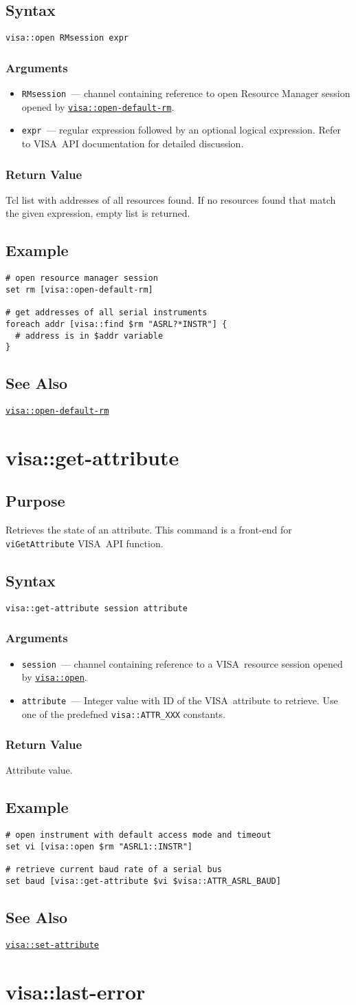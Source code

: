 \documentclass[12pt, a4paper]{report}
\newcommand{\VISA}{\mbox{VISA }}
\newcommand{\COMMANDREF}[1]{{\tt \hyperref[#1]{#1}}}
\newcommand{\VISACOMMANDREF}[1]{{\tt \mbox{#1}}\index{#1}}
\newcommand{\SEEALSO}{\subsection*{See Also}}
\newcommand{\EXAMPLE}{\subsection*{Example}}
\newcommand{\PURPOSE}{\subsection*{Purpose}}
\newcommand{\SYNTAX}[1]{\subsection*{Syntax}{\tt #1}}
\newcommand{\ARGUMENTS}{\subsubsection*{Arguments}}
\newcommand{\RETURN}{\subsubsection*{Return Value}}
\newcommand{\COMMAND}[1]{\section{#1}\label{#1}}
\newcommand{\BEGINARGUMENTS}{\ARGUMENTS\begin{itemize}}
\newcommand{\ENDARGUMENTS}{\end{itemize}}
\newcommand{\ARGUMENT}[1]{\item {\tt \mbox{#1}}~---}
\newcommand{\ARGCHANNEL}{\ARGUMENT{session} channel containing reference to a \VISA resource session opened by \COMMANDREF{visa::open}.}
\newcommand{\ARGRM}{\ARGUMENT{RMsession} channel containing reference to open Resource Manager session opened by \COMMANDREF{visa::open-default-rm}.}
\begin{document}
\SYNTAX{visa::open RMsession expr}

\BEGINARGUMENTS
\ARGRM
\ARGUMENT{expr} regular expression followed by an optional logical expression. Refer to \VISA API documentation for detailed discussion.
\ENDARGUMENTS

\RETURN

Tcl list with addresses of all resources found. If no resources found that match the given expression, empty list is returned.

\EXAMPLE

\begin{verbatim} 
# open resource manager session
set rm [visa::open-default-rm]

# get addresses of all serial instruments
foreach addr [visa::find $rm "ASRL?*INSTR"] {
  # address is in $addr variable
}
\end{verbatim} 

\SEEALSO

\COMMANDREF{visa::open-default-rm}


\COMMAND{visa::get-attribute}

\PURPOSE

Retrieves the state of an attribute. This command is a front-end for \VISACOMMANDREF{viGetAttribute} \VISA API function.

\SYNTAX{visa::get-attribute session attribute}

\BEGINARGUMENTS
\ARGCHANNEL
\ARGUMENT{attribute} Integer value with ID of the \VISA attribute to retrieve. Use one of the predefned {\tt visa::ATTR\_XXX} constants.
\ENDARGUMENTS

\RETURN

Attribute value.

\EXAMPLE

\begin{verbatim} 
# open instrument with default access mode and timeout
set vi [visa::open $rm "ASRL1::INSTR"]

# retrieve current baud rate of a serial bus
set baud [visa::get-attribute $vi $visa::ATTR_ASRL_BAUD]
\end{verbatim} 

\SEEALSO

\COMMANDREF{visa::set-attribute}


\COMMAND{visa::last-error}
\end{document}
